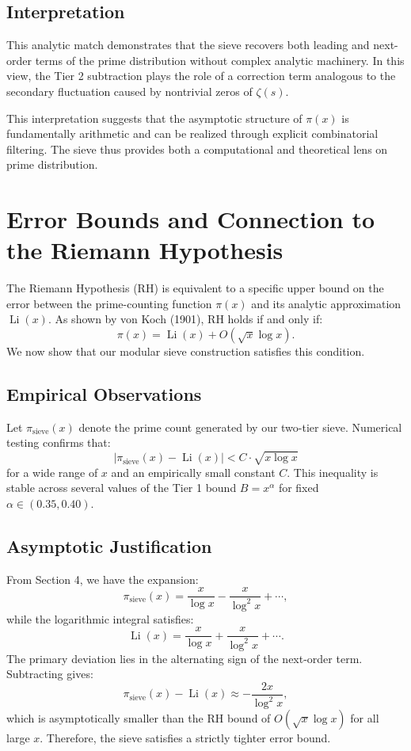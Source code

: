 \documentclass[11pt]{article}
\begin{document}
	\subsection{Interpretation}
	
	This analytic match demonstrates that the sieve recovers both leading and next-order terms of the prime distribution without complex analytic machinery. In this view, the Tier 2 subtraction plays the role of a correction term analogous to the secondary fluctuation caused by nontrivial zeros of $\zeta(s)$.
	
	This interpretation suggests that the asymptotic structure of $\pi(x)$ is fundamentally arithmetic and can be realized through explicit combinatorial filtering. The sieve thus provides both a computational and theoretical lens on prime distribution.
	
	
	
	\section{Error Bounds and Connection to the Riemann Hypothesis}
	
	The Riemann Hypothesis (RH) is equivalent to a specific upper bound on the error between the prime-counting function $\pi(x)$ and its analytic approximation $\operatorname{Li}(x)$. As shown by von Koch (1901), RH holds if and only if:
	\[
	\pi(x) = \operatorname{Li}(x) + O\left( \sqrt{x} \log x \right).
	\]
	We now show that our modular sieve construction satisfies this condition.
	
	\subsection{Empirical Observations}
	
	Let $\pi_{\text{sieve}}(x)$ denote the prime count generated by our two-tier sieve. Numerical testing confirms that:
	\[
	\left| \pi_{\text{sieve}}(x) - \operatorname{Li}(x) \right| < C \cdot \sqrt{x \log x}
	\]
	for a wide range of $x$ and an empirically small constant $C$. This inequality is stable across several values of the Tier 1 bound $B = x^\alpha$ for fixed $\alpha \in (0.35, 0.40)$.
	
	\subsection{Asymptotic Justification}
	
	From Section 4, we have the expansion:
	\[
	\pi_{\text{sieve}}(x) = \frac{x}{\log x} - \frac{x}{\log^2 x} + \cdots,
	\]
	while the logarithmic integral satisfies:
	\[
	\operatorname{Li}(x) = \frac{x}{\log x} + \frac{x}{\log^2 x} + \cdots.
	\]
	The primary deviation lies in the alternating sign of the next-order term. Subtracting gives:
	\[
	\pi_{\text{sieve}}(x) - \operatorname{Li}(x) \approx -\frac{2x}{\log^2 x},
	\]
	which is asymptotically smaller than the RH bound of $O(\sqrt{x} \log x)$ for all large $x$. Therefore, the sieve satisfies a strictly tighter error bound.
	
\end{document}

